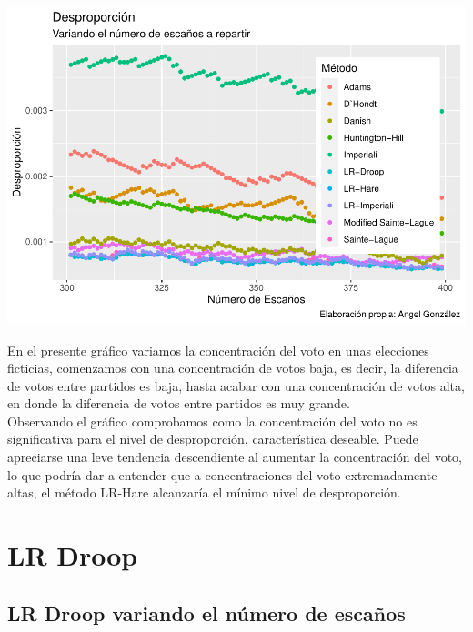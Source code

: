\documentclass[12pt,a4paper,]{book}
\numberwithin{dummy}{section}
\theoremstyle{ocrenumbox}
\theoremstyle{blacknumex}
\theoremstyle{blacknumbox}
\theoremstyle{ocrenum}
\theoremstyle{ocrenum}
\begin{document}
\begin{center}\includegraphics[width=0.95\linewidth]{figurasR/unnamed-chunk-55-1} \end{center}

En el presente gráfico variamos la concentración del voto en unas
elecciones ficticias, comenzamos con una concentración de votos baja, es
decir, la diferencia de votos entre partidos es baja, hasta acabar con
una concentración de votos alta, en donde la diferencia de votos entre
partidos es muy grande.\\
Observando el gráfico comprobamos como la concentración del voto no es
significativa para el nivel de desproporción, característica deseable.
Puede apreciarse una leve tendencia descendiente al aumentar la
concentración del voto, lo que podría dar a entender que a
concentraciones del voto extremadamente altas, el método LR-Hare
alcanzaría el mínimo nivel de desproporción.

\hypertarget{lr-droop}{%
\section{LR Droop}\label{lr-droop}}

\hypertarget{lr-droop-variando-el-nuxfamero-de-escauxf1os}{%
\subsection{LR Droop variando el número de
escaños}\label{lr-droop-variando-el-nuxfamero-de-escauxf1os}}
\end{document}

